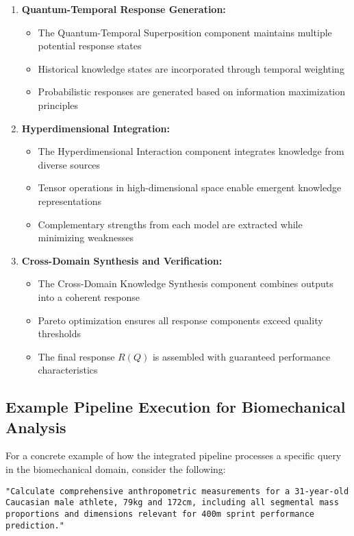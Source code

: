 \documentclass[journal,onecolumn]{IEEEtran}
\begin{document}
\begin{enumerate}
\item \textbf{Quantum-Temporal Response Generation:} 
\begin{itemize}
    \item The Quantum-Temporal Superposition component maintains multiple potential response states
    \item Historical knowledge states are incorporated through temporal weighting
    \item Probabilistic responses are generated based on information maximization principles
\end{itemize}

\item \textbf{Hyperdimensional Integration:} 
\begin{itemize}
    \item The Hyperdimensional Interaction component integrates knowledge from diverse sources
    \item Tensor operations in high-dimensional space enable emergent knowledge representations
    \item Complementary strengths from each model are extracted while minimizing weaknesses
\end{itemize}

\item \textbf{Cross-Domain Synthesis and Verification:} 
\begin{itemize}
    \item The Cross-Domain Knowledge Synthesis component combines outputs into a coherent response
    \item Pareto optimization ensures all response components exceed quality thresholds
    \item The final response $R(Q)$ is assembled with guaranteed performance characteristics
\end{itemize}
\end{enumerate}

\subsection{Example Pipeline Execution for Biomechanical Analysis}

For a concrete example of how the integrated pipeline processes a specific query in the biomechanical domain, consider the following:

\begin{lstlisting}[caption={Query Example}, label={lst:query-example}]
"Calculate comprehensive anthropometric measurements for a 31-year-old Caucasian male athlete, 79kg and 172cm, including all segmental mass proportions and dimensions relevant for 400m sprint performance prediction."
\end{lstlisting}
\end{document}
